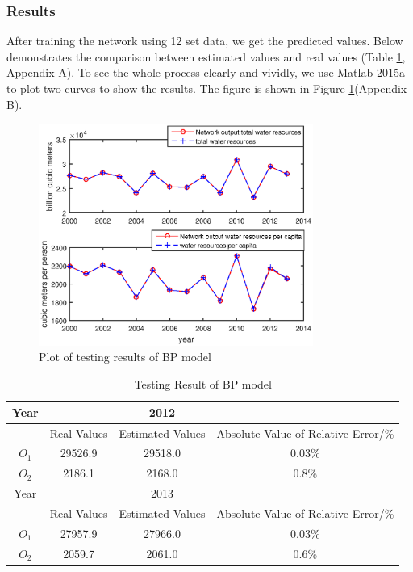\subsubsection{Results}
After training the network using 12 set data, we get the predicted values. Below demonstrates the comparison between estimated values and real values (Table \ref{testresults}, Appendix A). To see the whole process clearly and vividly, we use Matlab 2015a to plot two curves to show the results. The figure is shown in Figure \ref{testresultfigure}(Appendix B).
\begin{figure}[!htbp]
\small
\centering
\includegraphics[width=9cm]{./picture/testresults.eps}
\caption{Plot of testing results of BP model} \label{testresultfigure}
\end{figure}
\begin{table}[!htbp]
\centering\caption{Testing Result of BP model}
\begin{tabular}{c|ccc}
  \hline
  Year &  & 2012 & \\
  \hline
  & Real Values & Estimated Values & Absolute Value of Relative Error/\%   \\
  \hline
  $O_1$ & 29526.9 & 29518.0 & 0.03\% \\
  $O_2$ & 2186.1  & 2168.0  & 0.8\% \\
  \hline
  Year &  & 2013 & \\
  \hline
  & Real Values & Estimated Values & Absolute Value of Relative Error/\% \\
  \hline
  $O_1$ & 27957.9 & 27966.0 & 0.03\% \\
  $O_2$ & 2059.7  & 2061.0  & 0.6\% \\
  \hline
\end{tabular}\label{testresults}
\end{table}

